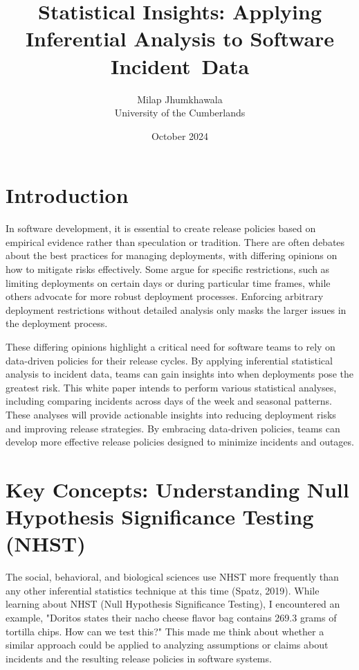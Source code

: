 \documentclass{article}
\title{Statistical Insights: Applying Inferential Analysis to Software Incident Data}
\author{
Milap Jhumkhawala \\
University of the Cumberlands
}
\date{October 2024}
\begin{document}
\maketitle
\newpage

\setcounter{tocdepth}{3} %
\tableofcontents
\newpage

\section{Introduction}
 
In software development, it is essential to create release policies based on empirical evidence rather than speculation or tradition. There are often debates about the best practices for managing deployments, with differing opinions on how to mitigate risks effectively. Some argue for specific restrictions, such as limiting deployments on certain days or during particular time frames, while others advocate for more robust deployment processes. Enforcing arbitrary deployment restrictions without detailed analysis only masks the larger issues in the deployment process.



These differing opinions highlight a critical need for software teams to rely on data-driven policies for their release cycles. By applying inferential statistical analysis to incident data, teams can gain insights into when deployments pose the greatest risk. This white paper intends to perform various statistical analyses, including comparing incidents across days of the week and seasonal patterns. These analyses will provide actionable insights into reducing deployment risks and improving release strategies. By embracing data-driven policies, teams can develop more effective release policies designed to minimize incidents and outages.

\section{Key Concepts: Understanding Null Hypothesis Significance Testing (NHST)}
The social, behavioral, and biological sciences use NHST more frequently than any other inferential statistics technique at this time (Spatz, 2019). While learning about NHST (Null Hypothesis Significance Testing), I encountered an example, "Doritos states their nacho cheese flavor bag contains 269.3 grams of tortilla chips. How can we test this?" This made me think about whether a similar approach could be applied to analyzing assumptions or claims about incidents and the resulting release policies in software systems.
\end{document}
